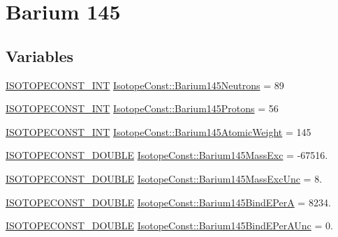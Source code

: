 \hypertarget{group___isotope_const-_barium-_ba145}{}\section{Barium 145}
\label{group___isotope_const-_barium-_ba145}
\subsection*{Variables}
\begin{DoxyCompactItemize}
\item 
\mbox{\hyperlink{group___isotope_const-_macros_ga5f18360b3e99483a35c32d789e62621c}{I\+S\+O\+T\+O\+P\+E\+C\+O\+N\+S\+T\+\_\+\+I\+NT}} \mbox{\hyperlink{group___isotope_const-_barium-_ba145_gae8b62838e8384e742a4b69158ff186b2}{Isotope\+Const\+::\+Barium145\+Neutrons}} = 89
\item 
\mbox{\hyperlink{group___isotope_const-_macros_ga5f18360b3e99483a35c32d789e62621c}{I\+S\+O\+T\+O\+P\+E\+C\+O\+N\+S\+T\+\_\+\+I\+NT}} \mbox{\hyperlink{group___isotope_const-_barium-_ba145_ga1e315cde6460c09814eb53efb414a6d7}{Isotope\+Const\+::\+Barium145\+Protons}} = 56
\item 
\mbox{\hyperlink{group___isotope_const-_macros_ga5f18360b3e99483a35c32d789e62621c}{I\+S\+O\+T\+O\+P\+E\+C\+O\+N\+S\+T\+\_\+\+I\+NT}} \mbox{\hyperlink{group___isotope_const-_barium-_ba145_gaafb854c4785f3573dd1d7de93b1d2133}{Isotope\+Const\+::\+Barium145\+Atomic\+Weight}} = 145
\item 
\mbox{\hyperlink{group___isotope_const-_macros_ga8f45a7272ce02c0b4c65c44636ed719a}{I\+S\+O\+T\+O\+P\+E\+C\+O\+N\+S\+T\+\_\+\+D\+O\+U\+B\+LE}} \mbox{\hyperlink{group___isotope_const-_barium-_ba145_gab01d6a3d41a78481c30eefb22750f7ea}{Isotope\+Const\+::\+Barium145\+Mass\+Exc}} = -\/67516.
\item 
\mbox{\hyperlink{group___isotope_const-_macros_ga8f45a7272ce02c0b4c65c44636ed719a}{I\+S\+O\+T\+O\+P\+E\+C\+O\+N\+S\+T\+\_\+\+D\+O\+U\+B\+LE}} \mbox{\hyperlink{group___isotope_const-_barium-_ba145_ga3ae124c421a56cdacd0f358e331cd49a}{Isotope\+Const\+::\+Barium145\+Mass\+Exc\+Unc}} = 8.
\item 
\mbox{\hyperlink{group___isotope_const-_macros_ga8f45a7272ce02c0b4c65c44636ed719a}{I\+S\+O\+T\+O\+P\+E\+C\+O\+N\+S\+T\+\_\+\+D\+O\+U\+B\+LE}} \mbox{\hyperlink{group___isotope_const-_barium-_ba145_gaf54d5fc5efbc4165699f50dfb455eccd}{Isotope\+Const\+::\+Barium145\+Bind\+E\+PerA}} = 8234.
\item 
\mbox{\hyperlink{group___isotope_const-_macros_ga8f45a7272ce02c0b4c65c44636ed719a}{I\+S\+O\+T\+O\+P\+E\+C\+O\+N\+S\+T\+\_\+\+D\+O\+U\+B\+LE}} \mbox{\hyperlink{group___isotope_const-_barium-_ba145_ga4ee25c484fc75a410197cdf67eb96844}{Isotope\+Const\+::\+Barium145\+Bind\+E\+Per\+A\+Unc}} = 0.

\end{DoxyCompactItemize}
